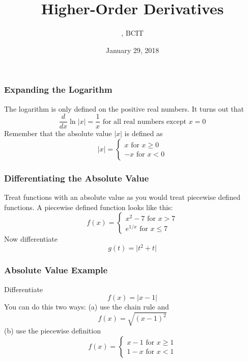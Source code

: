 \documentclass[xcolor=dvipsnames]{beamer}
\title{Higher-Order Derivatives}
\subtitle{{\CourseNumber}, BCIT}
\author{\CourseName}
\date{January 29, 2018}
\begin{document}
\begin{frame}
  \titlepage
\end{frame}

\begin{frame}
  \frametitle{Expanding the Logarithm}
The logarithm is only defined on the positive real numbers. It turns
out that
\begin{equation}
  \label{eq:feegeigu}
  \frac{d}{dx}\ln\vert{}x\vert=\frac{1}{x}\mbox{ for all real numbers except }x=0
\end{equation}
Remember that the absolute value $\vert{}x\vert$ is defined as
\begin{equation}
  \label{eq:iegeecie}
  \vert{}x\vert=\left\{
    \begin{array}{l}
      x\mbox{ for }x\geq{}0 \\
      -x\mbox{ for }x<0
    \end{array}\right.
\end{equation}
\end{frame}

\begin{frame}
  \frametitle{Differentiating the Absolute Value}
Treat functions with an absolute value as you would treat piecewise
defined functions. A piecewise defined function looks like this:
\begin{equation}
  \label{eq:iboashaz}
  f(x)=\left\{
    \begin{array}{l}
      x^{2}-7\mbox{ for }x>7 \\
      e^{1/x}\mbox{ for }x\leq{}7
    \end{array}\right.
\end{equation}
Now differentiate
\begin{equation}
  \label{eq:aeghooki}
  g(t)=\vert{}t^{2}+t\vert
\end{equation}
\end{frame}

\begin{frame}
  \frametitle{Absolute Value Example}
Differentiate
\begin{equation}
  \label{eq:eimufosh}
  f(x)=\vert{}x-1\vert
\end{equation}
You can do this two ways: (a) use the chain rule and
\begin{equation}
  \label{eq:agabooto}
f(x)=\sqrt{(x-1)^{2}}
\end{equation}
(b) use the piecewise definition
\begin{equation}
  \label{eq:ephohnge}
f(x)=\left\{
  \begin{array}{l}
    x-1\mbox{ for }x\geq{}1 \\
    1-x\mbox{ for }x<1
  \end{array}\right.
\end{equation}
\end{frame}
\end{document}
